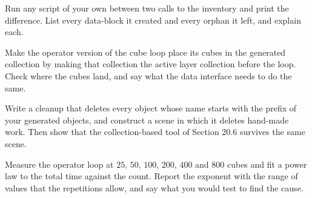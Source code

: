 \begin{exercise}
Run any script of your own between two calls to the inventory and print the difference. List every data-block it created and every orphan it left, and explain each.
\end{exercise}

\begin{exercise}
Make the operator version of the cube loop place its cubes in the generated collection by making that collection the active layer collection before the loop. Check where the cubes land, and say what the data interface needs to do the same.
\end{exercise}

\begin{exercise}
Write a cleanup that deletes every object whose name starts with the prefix of your generated objects, and construct a scene in which it deletes hand-made work. Then show that the collection-based tool of Section 20.6 survives the same scene.
\end{exercise}

\begin{exercise}
Measure the operator loop at $25$, $50$, $100$, $200$, $400$ and $800$ cubes and fit a power law to the total time against the count. Report the exponent with the range of values that the repetitions allow, and say what you would test to find the cause.
\end{exercise}
